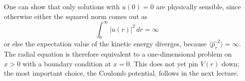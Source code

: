 One can show that only solutions with $u(0)=0$ are physically sensible, since otherwise either the squared norm comes out as 
\begin{equation}
	\int_0^\infty |u(r)|^2\, dr = \infty
\end{equation}
or else the expectation value of the kinetic energy diverges, because $\langle \widehat{p_r}^2\rangle = \infty$. The radial equation is therefore equivalent to a one-dimensional problem on $x>0$ with a boundary condition at $x=0$. This does not yet pin $V(r)$ down; the most important choice, the Coulomb potential, follows in the next lecture.

